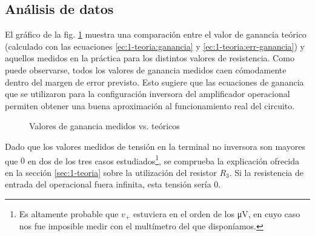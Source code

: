 \subsection{Análisis de datos}

El gráfico de la fig. \ref{fig:1-analisis:ganancia} muestra una comparación
entre el valor de ganancia teórico (calculado con las ecuaciones 
\ref{ec:1-teoria:ganancia} y \ref{ec:1-teoria:err-ganancia}) y aquellos 
medidos en la práctica para los distintos valores de resistencia. Como puede
observarse, todos los valores de ganancia medidos caen cómodamente dentro
del margen de error previsto. Esto sugiere que las ecuaciones de ganancia
que se utilizaron para la configuración inversora del amplificador operacional
permiten obtener una buena aproximación al funcionamiento real del circuito.

\begin{figure}[H]
    \centering
    
    \caption{Valores de ganancia medidos vs. teóricos}
    \label{fig:1-analisis:ganancia}
\end{figure}

Dado que los valores medidos de tensión en la terminal no inversora son
mayores que $0$ en dos de los tres casos estudiados\footnote{Es altamente
probable que $v_+$ estuviera en el orden de los \si{\micro\volt}, en cuyo
caso nos fue imposible medir con el multímetro del que disponíamos.}, se
comprueba la explicación ofrecida en la sección \ref{sec:1-teoria} sobre la
utilización del resistor $R_3$. Si la resistencia de entrada del operacional
fuera infinita, esta tensión sería 0.
